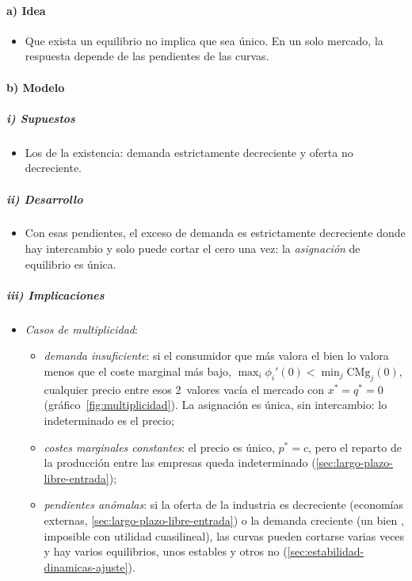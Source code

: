 \documentclass[11pt]{article}
\begin{document}
\paragraph{a) Idea}

\begin{itemize}
\item Que exista un equilibrio no implica que sea único. En un solo mercado, la respuesta depende de las pendientes de las curvas.
\end{itemize}

\paragraph{b) Modelo}

\subparagraph{i) Supuestos}

\begin{itemize}
\item Los de la existencia: demanda estrictamente decreciente y oferta no decreciente.
\end{itemize}

\subparagraph{ii) Desarrollo}

\begin{itemize}
\item Con esas pendientes, el exceso de demanda es estrictamente decreciente donde hay intercambio y solo puede cortar el cero una vez: la \emph{asignación} de equilibrio es única\nocite{MasColellWhinstonGreen1995}.
\end{itemize}

\subparagraph{iii) Implicaciones}

\begin{itemize}
\item \emph{Casos de multiplicidad}:
  \begin{itemize}
  \item \emph{demanda insuficiente}: si el consumidor que más valora el bien lo valora menos que el coste marginal más bajo, $\max_i\phi_i'(0)<\min_j\mathrm{CMg}_j(0)$, cualquier precio entre esos 2~valores vacía el mercado con $x^*=q^*=0$ (gráfico~\ref{fig:multiplicidad}). La asignación es única, sin intercambio: lo indeterminado es el precio;
  \item \emph{costes marginales constantes}: el precio es único, $p^*=c$, pero el reparto de la producción entre las empresas queda indeterminado (\ref{sec:largo-plazo-libre-entrada});
  \item \emph{pendientes anómalas}: si la oferta de la industria es decreciente (economías externas, \ref{sec:largo-plazo-libre-entrada}) o la demanda creciente (un bien , imposible con utilidad cuasilineal), las curvas pueden cortarse varias veces y hay varios equilibrios, unos estables y otros no (\ref{sec:estabilidad-dinamicas-ajuste}).
  \end{itemize}
\end{itemize}
\end{document}

